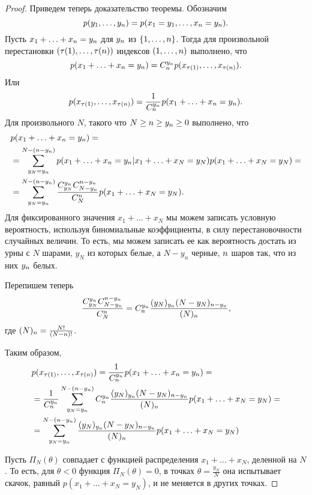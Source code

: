 \begin{proof}

Приведем теперь доказательство теоремы.
Обозначим
\[
p(y_1, \ldots, y_{n}) = p(x_1 = y_1, \ldots, x_{n} = y_{n}).
\]
Пусть $x_1 + \ldots + x_{n} = y_{n}$ для $y_{n}$ из $\{1, \ldots, n\}$.
Тогда для произвольной перестановки $(\tau(1), \ldots, \tau(n))$ индексов $(1, \ldots, n)$ выполнено, что
\[
p(x_1 + \ldots + x_{n} = y_{n}) = C^{y_{n}}_{n} p(x_{\tau(1)}, \ldots, x_{\tau(n)}).
\]
Или 
\[
p(x_{\tau(1)}, \ldots, x_{\tau(n)}) = 
\frac{1}{C^{y_{n}}_{n}} p(x_1 + \ldots + x_{n} = y_{n}).
\]
Для произвольного $N$, такого что $N \geq n \geq y_{n} \geq 0$
выполнено, что
\begin{align*}
&p(x_1 + \ldots + x_{n} = y_{n}) =\\
&= \sum_{y_{N} = y_{n}}^{N - (n - y_{n})} p(x_1 + \ldots + x_{n} = y_{n} | x_1 + \ldots + x_{N} = y_{N}) p(x_1 + \ldots + x_{N} = y_{N}) = \\
&= \sum_{y_{N} = y_{n}}^{N - (n - y_{n})} \frac{C_{y_N}^{y_n} C_{N - y_{n}}^{n - y_n}}{C_N^n} p(x_1 + \ldots + x_{N} = y_{N}).
\end{align*}
Для фиксированного значения $x_1 + \ldots + x_{N}$ мы можем записать условную вероятность, используя биномиальные коэффициенты, в силу перестановочности случайных величин.
То есть, мы можем записать ее как вероятность достать из урны с $N$ шарами, $y_N$ из которых белые, а $N - y_n$ черные, $n$ шаров так, что из них $y_{n}$ белых.

Перепишем теперь 
\[
\frac{C_{y_N}^{y_n} C_{N - y_{n}}^{n - y_n}}{C_N^n} = C^{y_n}_{n} \frac{(y_N)_{y_n} (N - y_N)_{n - y_n}}{(N)_n},
\]
где $(N)_{n} = \frac{N!}{(N - n)!}$.

Таким образом, 
\begin{align*}
&p(x_{\tau(1)}, \ldots, x_{\tau(n)}) = 
\frac{1}{C^{y_{n}}_{n}} p(x_1 + \ldots + x_{n} = y_{n}) = \\
&= \frac{1}{C^{y_{n}}_{n}} \sum_{y_{N} = y_{n}}^{N - (n - y_{n})} C^{y_n}_{n} \frac{(y_N)_{y_n} (N - y_N)_{n - y_n}}{(N)_n} p(x_1 + \ldots + x_{N} = y_{N}) = \\
&= \sum_{y_{N} = y_{n}}^{N - (n - y_{n})} \frac{(y_N)_{y_n} (N - y_N)_{n - y_n}}{(N)_n} p(x_1 + \ldots + x_{N} = y_{N})
\end{align*}

Пусть $\Pi_N(\theta)$ совпадает с функцией распределения $x_1 + \ldots + x_{N}$, деленной на $N$.
То есть, для $\theta < 0$ функция $\Pi_N(\theta) = 0$, в точках $\theta = \frac{y_N}{N}$ она испытывает скачок, равный $p(x_1 + \ldots + x_{N} = y_{N})$, и не меняется в других точках.


\end{proof}
